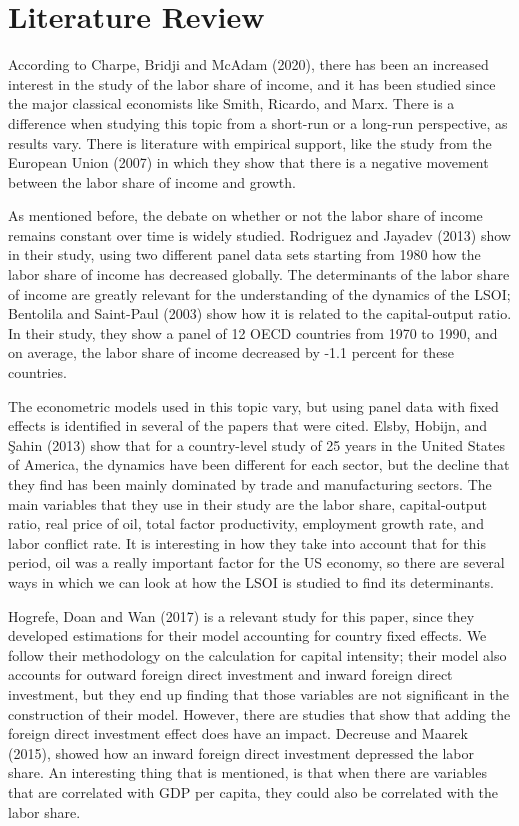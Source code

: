 \documentclass[12pt, letterpaper]{article}
\numberwithin{table}{section}   %
\begin{document}
\section{Literature Review}\label{sec_2}
According to Charpe, Bridji and McAdam (2020), there has been an increased interest in the study of the labor share of income, and it has been studied since the major classical economists like Smith, Ricardo, and Marx. There is a difference when studying this topic from a short-run or a long-run perspective, as results vary. There is literature with empirical support, like the study from the European Union (2007) in which they show that there is a negative movement between the labor share of income and growth.

As mentioned before, the debate on whether or not the labor share of income remains constant over time is widely studied. Rodriguez and Jayadev (2013) show in their study, using two different panel data sets starting from 1980 how the labor share of income has decreased globally. The determinants of the labor share of income are greatly relevant for the understanding of the dynamics of the LSOI; Bentolila and Saint-Paul (2003) show how it is related to the capital-output ratio. In their study, they show a panel of 12 OECD countries from 1970 to 1990, and on average, the labor share of income decreased by -1.1 percent for these countries. 

The econometric models used in this topic vary, but using panel data with fixed effects is identified in several of the papers that were cited. Elsby, Hobijn, and Şahin (2013) show that for a country-level study of 25 years in the United States of America, the dynamics have been different for each sector, but the decline that they find has been mainly dominated by trade and manufacturing sectors. The main variables that they use in their study are the labor share,  capital-output ratio, real price of oil, total factor productivity, employment growth rate, and labor conflict rate. It is interesting in how they take into account that for this period, oil was a really important factor for the US economy, so there are several ways in which we can look at how the LSOI is studied to find its determinants.

Hogrefe, Doan and Wan (2017) is a relevant study for this paper, since they developed estimations for their model accounting for country fixed effects. We follow their methodology on the calculation for capital intensity; their model also accounts for outward foreign direct investment and inward foreign direct investment, but they end up finding that those variables are not significant in the construction of their model. However, there are studies that show that adding the foreign direct investment effect does have an impact. Decreuse and Maarek (2015), showed how an inward foreign direct investment depressed the labor share. An interesting thing that is mentioned, is that when there are variables that are correlated with GDP per capita, they could also be correlated with the labor share.
\end{document}
